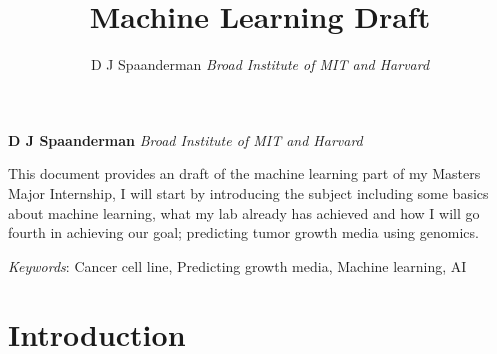 \documentclass[11pt,]{article}
\title{Machine Learning Draft  }
\author{\Large D J Spaanderman\vspace{0.05in} \newline\normalsize\emph{Broad Institute of MIT and Harvard}  }
\date{}
\newcommand*{\authorfont}{\fontfamily{phv}\selectfont}
\renewenvironment{abstract}
 {{%
    \setlength{\leftmargin}{0mm}
    \setlength{\rightmargin}{\leftmargin}%
  }%
  \relax}
 {\endlist}
\begin{document}
	
%

{%
\setlength{\parindent}{0pt}
\thispagestyle{plain}
{\fontsize{18}{20}\selectfont\raggedright 
\maketitle  %

}

{
   \vskip 13.5pt\relax \normalsize\fontsize{11}{12} 
\textbf{\authorfont D J Spaanderman} \hskip 15pt \emph{\small Broad Institute of MIT and Harvard}   

}

}








\begin{abstract}

    \hbox{\vrule height .2pt width 39.14pc}

    \vskip 8.5pt %

\noindent This document provides an draft of the machine learning part of my
Masters Major Internship, I will start by introducing the subject
including some basics about machine learning, what my lab already has
achieved and how I will go fourth in achieving our goal; predicting
tumor growth media using genomics.


\vskip 8.5pt \noindent \emph{Keywords}: Cancer cell line, Predicting growth media, Machine learning, AI \par

    \hbox{\vrule height .2pt width 39.14pc}



\end{abstract}


\vskip -8.5pt

{
\hypersetup{linkcolor=black}
\setcounter{tocdepth}{2}
}


\noindent  

\hypertarget{introduction}{%
\section{Introduction}\label{introduction}}
\end{document}
